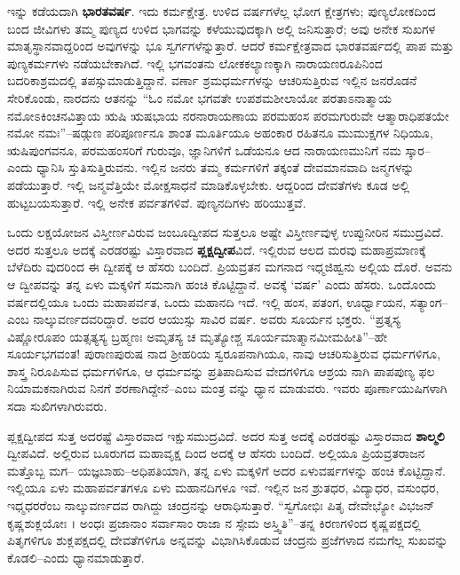 ಇನ್ನು ಕಡೆಯದಾಗಿ \textbf{ಭಾರತವರ್ಷ}. ಇದು ಕರ್ಮಕ್ಷೇತ್ರ. ಉಳಿದ ವರ್ಷಗಳೆಲ್ಲ ಭೋಗ ಕ್ಷೇತ್ರಗಳು; ಪುಣ್ಯಲೋಕದಿಂದ ಬಂದ ಜೀವಿಗಳು ತಮ್ಮ ಪುಣ್ಯದ ಉಳಿದ ಭಾಗವನ್ನು ಕಳೆಯುವುದಕ್ಕಾಗಿ ಅಲ್ಲಿ ಜನಿಸುತ್ತಾರೆ; ಅವು ಅನೇಕ ಸುಖಗಳ ಮಾತೃಸ್ಥಾನವಾದ್ದರಿಂದ ಅವುಗಳನ್ನು ಭೂ ಸ್ವರ್ಗಗಳೆನ್ನುತ್ತಾರೆ. ಆದರೆ ಕರ್ಮಕ್ಷೇತ್ರವಾದ ಭಾರತವರ್ಷದಲ್ಲಿ ಪಾಪ ಮತ್ತು ಪುಣ್ಯಕರ್ಮಗಳು ನಡೆಯಬೇಕಾಗಿದೆ. ಇಲ್ಲಿ ಭಗವಂತನು ಲೋಕಕಲ್ಯಾಣಕ್ಕಾಗಿ ನಾರಾಯಣರೂಪಿನಿಂದ ಬದರಿಕಾಶ್ರಮದಲ್ಲಿ ತಪಸ್ಸುಮಾಡುತ್ತಿದ್ದಾನೆ. ವರ್ಣಾ ಶ್ರಮಧರ್ಮಗಳನ್ನು ಆಚರಿಸುತ್ತಿರುವ ಇಲ್ಲಿನ ಜನರೊಡನೆ ಸೇರಿಕೊಂಡು, ನಾರದನು ಆತನನ್ನು “ಓಂ ನಮೋ ಭಗವತೇ ಉಪಶಮಶೀಲಾಯೋ ಪರತಾಽನಾತ್ಮಾಯ ನಮೋಽಕಿಂಚನವಿತ್ತಾಯ ಋಷಿ ಋಷಭಾಯ ನರನಾರಾಯಣಾಯ ಪರಮಹಂಸ ಪರಮಗುರುವೇ ಆತ್ಮಾರಾಧಿಪತಯೇ ನಮೋ ನಮಃ”–ಷಡ್ಗುಣ ಪರಿಪೂರ್ಣನೂ ಶಾಂತ ಮೂರ್ತಿಯೂ ಅಹಂಕಾರ ರಹಿತನೂ ಮುಮುಕ್ಷಗಳ ನಿಧಿಯೂ, ಋಷಿಪುಂಗವನೂ, ಪರಮಹಂಸರಿಗೆ ಗುರುವೂ, ಜ್ಞಾನಿಗಳಿಗೆ ಒಡೆಯನೂ ಆದ ನಾರಾಯಣಮುನಿಗೆ ನಮ ಸ್ಕಾರ–ಎಂದು ಧ್ಯಾನಿಸಿ ಸ್ತುತಿಸುತ್ತಿರುವನು. ಇಲ್ಲಿನ ಜನರು ತಮ್ಮ ಕರ್ಮಗಳಿಗೆ ತಕ್ಕಂತೆ ದೇವಮಾನವಾದಿ ಜನ್ಮಗಳನ್ನು ಪಡೆಯುತ್ತಾರೆ. ಇಲ್ಲಿ ಜನ್ಮವೆತ್ತಿಯೇ ಮೋಕ್ಷಸಾಧನೆ ಮಾಡಿಕೊಳ್ಳಬೇಕು. ಆದ್ದರಿಂದ ದೇವತೆಗಳು ಕೂಡ ಅಲ್ಲಿ ಹುಟ್ಟಬಯಸುತ್ತಾರೆ. ಇಲ್ಲಿ ಅನೇಕ ಪರ್ವತಗಳಿವೆ. ಪುಣ್ಯನದಿಗಳು ಹರಿಯುತ್ತವೆ.

ಒಂದು ಲಕ್ಷಯೋಜನ ವಿಸ್ತೀರ್ಣವಿರುವ ಜಂಬೂದ್ವೀಪದ ಸುತ್ತಲೂ ಅಷ್ಟೇ ವಿಸ್ತೀರ್ಣವುಳ್ಳ ಉಪ್ಪುನೀರಿನ ಸಮುದ್ರವಿದೆ. ಅದರ ಸುತ್ತಲೂ ಅದಕ್ಕೆ ಎರಡರಷ್ಟು ವಿಸ್ತಾರವಾದ \textbf{ಪ್ಲಕ್ಷದ್ವೀಪ}ವಿದೆ. ಇಲ್ಲಿರುವ ಆಲದ ಮರವು ಮಹಾಪ್ರಮಾಣಕ್ಕೆ ಬೆಳೆದಿರು ವುದರಿಂದ ಈ ದ್ವೀಪಕ್ಕೆ ಆ ಹೆಸರು ಬಂದಿದೆ. ಪ್ರಿಯವ್ರತನ ಮಗನಾದ ಇಧ್ಮಜಿಹ್ವನು ಅಲ್ಲಿಯ ದೊರೆ. ಅವನು ಆ ದ್ವೀಪವನ್ನು ತನ್ನ ಏಳು ಮಕ್ಕಳಿಗೆ ಸಮನಾಗಿ ಹಂಚಿ ಕೊಟ್ಟಿದ್ದಾನೆ. ಅವಕ್ಕೆ ‘ವರ್ಷ’ ಎಂದು ಹೆಸರು. ಒಂದೊಂದು ವರ್ಷದಲ್ಲಿಯೂ ಒಂದು ಮಹಾಪರ್ವತ, ಒಂದು ಮಹಾನದಿ ಇದೆ. ಇಲ್ಲಿ ಹಂಸ, ಪತಂಗ, ಊರ್ಧ್ವಾಯನ, ಸತ್ಯಾಂಗ–ಎಂಬ ನಾಲ್ಕುವರ್ಣದವರಿದ್ದಾರೆ. ಅವರ ಆಯುಸ್ಸು ಸಾವಿರ ವರ್ಷ. ಅವರು ಸೂರ್ಯನ ಭಕ್ತರು. “ಪ್ರತ್ನಸ್ಯ ವಿಷ್ಣೋರೂಪಂ ಯತ್ಸತ್ಯಸ್ಯ ಬ್ರಹ್ಮಣಃ ಅಮೃತಸ್ಯ ಚ ಮೃತ್ಯೋಶ್ಚ ಸೂರ್ಯಮಾತ್ಮಾನಮೀಮಹೀತಿ”–ಹೇ ಸೂರ್ಯಭಗವಂತ! ಪುರಾಣಪುರುಷ ನಾದ ಶ್ರೀಹರಿಯ ಸ್ವರೂಪನಾಗಿಯೂ, ನಾವು ಆಚರಿಸುತ್ತಿರುವ ಧರ್ಮಗಳಿಗೂ, ಶಾಸ್ತ್ರ ನಿರೂಪಿಸುವ ಧರ್ಮಗಳಿಗೂ, ಆ ಧರ್ಮವನ್ನು ಪ್ರತಿಪಾದಿಸುವ ವೇದಗಳಿಗೂ ಆಶ್ರಯ ನಾಗಿ ಪಾಪಪುಣ್ಯ ಫಲ ನಿಯಾಮಕನಾಗಿರುವ ನಿನಗೆ ಶರಣಾಗಿದ್ದೇನೆ–ಎಂಬ ಮಂತ್ರ ವನ್ನು ಧ್ಯಾನ ಮಾಡುವರು. ಇವರು ಪೂರ್ಣಾಯುಷಿಗಳಾಗಿ ಸದಾ ಸುಖಿಗಳಾಗಿರುವರು.

ಪ್ಲಕ್ಷದ್ವೀಪದ ಸುತ್ತ ಅದರಷ್ಟೆ ವಿಸ್ತಾರವಾದ ಇಕ್ಷುಸಮುದ್ರವಿದೆ. ಅದರ ಸುತ್ತ ಅದಕ್ಕೆ ಎರಡರಷ್ಟು ವಿಸ್ತಾರವಾದ \textbf{ಶಾಲ್ಮಲಿ} ದ್ವೀಪವಿದೆ. ಅಲ್ಲಿರುವ ಬೂರುಗದ ಮಹಾವೃಕ್ಷ ದಿಂದ ಅದಕ್ಕೆ ಆ ಹೆಸರು ಬಂದಿದೆ. ಅಲ್ಲಿಯೂ ಪ್ರಿಯವ್ರತರಾಜನ ಮತ್ತೊಬ್ಬ ಮಗ– ಯಜ್ಞಬಾಹು–ಅಧಿಪತಿಯಾಗಿ, ತನ್ನ ಏಳು ಮಕ್ಕಳಿಗೆ ಅದರ ಏಳುವರ್ಷಗಳನ್ನು ಹಂಚಿ ಕೊಟ್ಟಿದ್ದಾನೆ. ಇಲ್ಲಿಯೂ ಏಳು ಮಹಾಪರ್ವತಗಳೂ ಏಳು ಮಹಾನದಿಗಳೂ ಇವೆ. ಇಲ್ಲಿನ ಜನ ಶ್ರುತಧರ, ವಿದ್ಯಾಧರ, ವಸುಂಧರ, ಇಧ್ಮಧರರೆಂಬ ನಾಲ್ಕುವರ್ಣದವ ರಾಗಿದ್ದು ಚಂದ್ರನನ್ನು ಆರಾಧಿಸುತ್ತಾರೆ. “ಸ್ವಗೋಭಿಃ ಪಿತೃ ದೇವೇಭ್ಯೋ ವಿಭಜನ್ ಕೃಷ್ಣಶುಕ್ಲಯೋಃ । ಅಂಧಃ ಪ್ರಜಾನಾಂ ಸರ್ವಾಸಾಂ ರಾಜಾ ನ ಸ್ಸೇಮ ಅಸ್ತ್ವಿತಿ”–ತನ್ನ ಕಿರಣಗಳಿಂದ ಕೃಷ್ಣಪಕ್ಷದಲ್ಲಿ ಪಿತೃಗಳಿಗೂ ಶುಕ್ಲಪಕ್ಷದಲ್ಲಿ ದೇವತೆಗಳಿಗೂ ಅನ್ನವನ್ನು ವಿಭಾಗಿಸಿಕೊಡುವ ಚಂದ್ರನು ಪ್ರಜೆಗಳಾದ ನಮಗೆಲ್ಲ ಸುಖವನ್ನು ಕೊಡಲಿ–ಎಂದು ಧ್ಯಾನಮಾಡುತ್ತಾರೆ.


